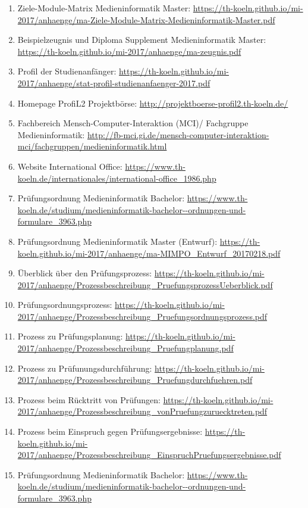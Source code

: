 \documentclass[BCOR12mm,DIV11,titlepage,a4paper,oneside,10pt]{scrbook}
\begin{document}
\begin{sloppypar}
\begin{flushleft}
\begin{enumerate}
\item{Ziele-Module-Matrix Medieninformatik Master: \url{https://th-koeln.github.io/mi-2017/anhaenge/ma-Ziele-Module-Matrix-Medieninformatik-Master.pdf} } 
\item{Beispielzeugnis und Diploma Supplement Medieninformatik Master: \url{https://th-koeln.github.io/mi-2017/anhaenge/ma-zeugnis.pdf} } 
\item{Profil der Studienanfänger: \url{https://th-koeln.github.io/mi-2017/anhaenge/stat-profil-studienanfaenger-2017.pdf} } 
\item{Homepage ProfiL2 Projektbörse: \url{http://projektboerse-profil2.th-koeln.de/} } 
\item{Fachbereich Mensch-Computer-Interaktion (MCI)/ Fachgruppe Medieninformatik: \url{http://fb-mci.gi.de/mensch-computer-interaktion-mci/fachgruppen/medieninformatik.html} } 
\item{Website International Office: \url{https://www.th-koeln.de/internationales/international-office\_1986.php} } 
\item{Prüfungsordnung Medieninformatik Bachelor: \url{https://www.th-koeln.de/studium/medieninformatik-bachelor--ordnungen-und-formulare\_3963.php} } 
\item{Prüfungsordnung Medieninformatik Master (Entwurf): \url{https://th-koeln.github.io/mi-2017/anhaenge/ma-MIMPO\_Entwurf\_20170218.pdf} } 
\item{Überblick über den Prüfungsprozess: \url{https://th-koeln.github.io/mi-2017/anhaenge/Prozessbeschreibung\_PruefungsprozessUeberblick.pdf} } 
\item{Prüfungsordnungsprozess: \url{https://th-koeln.github.io/mi-2017/anhaenge/Prozessbeschreibung\_Pruefungsordnungsprozess.pdf} } 
\item{Prozess zu Prüfungsplanung: \url{https://th-koeln.github.io/mi-2017/anhaenge/Prozessbeschreibung\_Pruefungplanung.pdf} } 
\item{Prozess zu Prüfunungsdurchführung: \url{https://th-koeln.github.io/mi-2017/anhaenge/Prozessbeschreibung\_Pruefungdurchfuehren.pdf} } 
\item{Prozess beim Rücktritt von Prüfungen: \url{https://th-koeln.github.io/mi-2017/anhaenge/Prozessbeschreibung\_vonPruefungzuruecktreten.pdf} } 
\item{Prozess beim Einspruch gegen Prüfungsergebnisse: \url{https://th-koeln.github.io/mi-2017/anhaenge/Prozessbeschreibung\_EinspruchPruefungsergebnisse.pdf} } 
\item{Prüfungsordnung Medieninformatik Bachelor: \url{https://www.th-koeln.de/studium/medieninformatik-bachelor--ordnungen-und-formulare\_3963.php} } 

\end{enumerate}
\end{flushleft}
\end{sloppypar}
\end{document}
